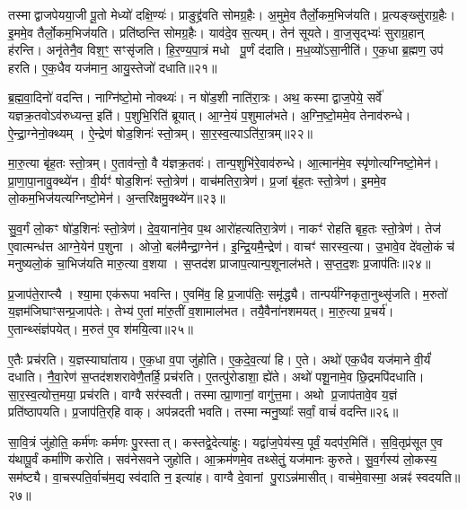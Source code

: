 तस्माद्वाजपेयया॒जी पू॒तो मेध्यो॑ दक्षि॒ण्यः॑।
प्राङुद्द्र॑वति सोमग्र॒हैः।
अ॒मुमे॒व तैर्लो॒कम॒भिज॑यति।
प्र॒त्यङ्ख्सु॑राग्र॒हैः।
इ॒ममे॒व तैर्लो॒कम॒भिज॑यति।
प्रति॑ष्ठन्ति सोमग्र॒हैः।
याव॑दे॒व स॒त्यम्।
तेन॑ सूयते।
वा॒ज॒सृद्भ्यः॑ सुराग्र॒हान् ह॑रन्ति।
अनृ॑तेनै॒व विश॒ꣳ॒ सꣳसृ॑जति।
हि॒र॒ण्य॒पा॒त्रं मधो पू॒र्णं द॑दाति।
म॒ध॒व्यो॑\-ऽसा॒नीति॑।
ए॒क॒धा ब्र॒ह्मण॒ उप॑ हरति।
ए॒क॒धैव यज॑मान॒ आयु॒स्तेजो॑ दधाति॥२१॥

ब्र॒ह्म॒वा॒दिनो॑ वदन्ति।
नाग्नि॑ष्टो॒मो नोक्थ्यः॑।
न षो॑ड॒शी नाति॑रा॒त्रः।
अथ॒ कस्माद्वाज॒पेये॒ सर्वे॑ यज्ञक्र॒तवो\-ऽव॑रुध्यन्त॒ इति॑।
प॒शुभि॒रिति॑ ब्रूयात्।
आ॒ग्ने॒यं प॒शुमाल॑भते।
अ॒ग्नि॒ष्टो॒ममे॒व तेनाव॑रुन्धे।
ऐ॒न्द्रा॒ग्नेनो॒क्थ्यम्।
ऐ॒न्द्रेण॑ षोड॒शिनः॑ स्तो॒त्रम्।
सा॒र॒स्व॒त्या\-ऽति॑रा॒त्रम्॥२२॥

मा॒रु॒त्या बृ॑ह॒तः स्तो॒त्रम्।
ए॒ताव॑न्तो॒ वै य॑ज्ञक्र॒तवः॑।
तान्प॒शुभि॑रे॒वाव॑रुन्धे।
आ॒त्मान॑मे॒व स्पृ॑णोत्यग्निष्टो॒मेन॑।
प्रा॒णा॒पा॒नावु॒क्थ्ये॑न।
वी॒र्यꣳ॑ षोड॒शिनः॑ स्तो॒त्रेण॑।
वाच॑मतिरा॒त्रेण॑।
प्र॒जां बृ॑ह॒तः स्तो॒त्रेण॑।
इ॒ममे॒व लो॒कम॒भिज॑यत्यग्निष्टो॒मेन॑।
अ॒न्तरि॑क्षमु॒क्थ्ये॑न॥२३॥

सु॒व॒र्गं लो॒कꣳ षो॑ड॒शिनः॑ स्तो॒त्रेण॑।
दे॒व॒याना॑ने॒व प॒थ आरो॑हत्यतिरा॒त्रेण॑।
नाकꣳ॑ रोहति बृह॒तः स्तो॒त्रेण॑।
तेज॑ ए॒वात्मन्ध॑त्त आग्ने॒येन॑ प॒शुना।
ओजो॒ बल॑मैन्द्रा॒ग्नेन॑।
इ॒न्द्रि॒यमै॒न्द्रेण॑।
वाचꣳ॑ सारस्व॒त्या।
उ॒भावे॒व दे॑वलो॒कं च॑ मनुष्यलो॒कं चा॒भिज॑यति मारु॒त्या व॒शया।
स॒प्तद॑श प्राजाप॒त्यान्प॒शूनाल॑भते।
स॒प्त॒द॒शः प्र॒जाप॑तिः॥२४॥

प्र॒जाप॑ते॒राप्त्यै।
श्या॒मा एक॑रूपा भवन्ति।
ए॒वमि॑व॒ हि प्र॒जाप॑तिः॒ समृ॑द्ध्यै।
तान्पर्य॑ग्निकृता॒नुथ्सृ॑जति।
म॒रुतो॑ य॒ज्ञम॑जिघाꣳसन्प्र॒जाप॑तेः।
तेभ्य॑ ए॒तां मा॑रु॒तीं व॒शामाल॑भत।
तयै॒वैना॑नशमयत्।
मा॒रु॒त्या प्र॒चर्य॑।
ए॒तान्थ्संज्ञ॑पयेत्।
म॒रुत॑ ए॒व श॑मयि॒त्वा॥२५॥

ए॒तैः प्रच॑रति।
य॒ज्ञस्याघा॑ताय।
ए॒क॒धा व॒पा जु॑होति।
ए॒क॒दे॒व॒त्या॑ हि।
ए॒ते।
अथो॑ एक॒धैव यज॑माने वी॒र्यं॑ दधाति।
नै॒वा॒रेण॑ स॒प्तद॑शशरावेणै॒तर्\mbox{}हि॒ प्रच॑रति।
ए॒तत्पु॑रोडाशा॒ ह्ये॑ते।
अथो॑ पशू॒नामे॒व छि॒द्रमपि॑दधाति।
सा॒र॒स्व॒त्योत्त॒मया॒ प्रच॑रति।
वाग्वै सर॑स्वती।
तस्मात्प्रा॒णानां॒ वागु॑त्त॒मा।
अथो प्र॒जाप॑तावे॒व य॒ज्ञं प्रति॑ष्ठापयति।
प्र॒जाप॑ति॒र्‌\mbox{}हि वाक्।
अप॑न्नदती भवति।
तस्मान्मनु॒ष्याः᳚ सर्वां॒ वाचं॑ वदन्ति॥२६॥\anuvakamend[अ॒ति॒रा॒त्रम॒न्तरि॑क्षमु॒क्थ्ये॑न प्र॒जाप॑तिः शमयि॒त्वोत्त॒मया॒ प्रच॑रति॒ षट् च॑]

सा॒वि॒त्रं जु॑होति॒ कर्म॑णः कर्मणः पु॒रस्तात्।
कस्तद्वे॒देत्या॑हुः।
यद्वा॑ज॒पेय॑स्य॒ पूर्वं॒ यदप॑र॒मिति॑।
स॒वि॒तृप्र॑सूत ए॒व य॑थापू॒र्वं कर्मा॑णि करोति।
सव॑नेसवने जुहोति।
आ॒क्रम॑णमे॒व तथ्सेतुं॒ यज॑मानः कुरुते।
सु॒व॒र्गस्य॑ लो॒कस्य॒ सम॑ष्ट्यै।
वा॒चस्पति॒र्वाच॑म॒द्य स्व॑दाति न॒ इत्या॑ह।
वाग्वै दे॒वानां पु॒रा\-ऽन्न॑मासीत्।
वाच॑मे॒वास्मा॒ अन्नꣴ॑ स्वदयति॥२७॥

